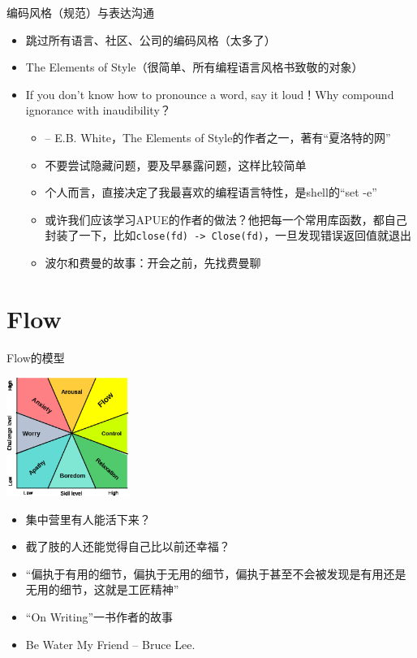 \documentclass[presentation,dvipdfmx,CJKbookmarks]{beamer}
\begin{document}
\begin{CJK*}{UTF8}{simsun}
\begin{frame}[label={sec:org88488d1},fragile]{编码风格（规范）与表达沟通}
 \begin{itemize}[<+->]
\item 跳过所有语言、社区、公司的编码风格（太多了）
\item The Elements of Style（很简单、所有编程语言风格书致敬的对象）
\item If you don't know how to pronounce a word, say it loud！Why compound ignorance with inaudibility？
\begin{itemize}
\item -- E.B. White，The Elements of Style\thinspace 的作者之一，著有“夏洛特的网”
\item 不要尝试隐藏问题，要及早暴露问题，这样比较简单
\item 个人而言，直接决定了我最喜欢的编程语言特性，是\thinspace shell\thinspace 的“set -e”
\item 或许我们应该学习\thinspace APUE\thinspace 的作者的做法？他把每一个常用库函数，都自己封装了一下，比如\thinspace \texttt{close(fd) -> Close(fd)}，一旦发现错误返回值就退出
\end{itemize}

\begin{itemize}
\item 波尔和费曼的故事：开会之前，先找费曼聊
\end{itemize}
\end{itemize}
\end{frame}

\section{Flow}
\label{sec:org41f28eb}

\begin{frame}[label={sec:orge595e17}]{}
\begin{block}{Flow\thinspace 的模型}
\begin{center}
\includegraphics[width=4cm]{./images/flow.ps}
\end{center}
\pause
\begin{itemize}[<+->]
\item 集中营里有人能活下来？
\item 截了肢的人还能觉得自己比以前还幸福？
\item “偏执于有用的细节，偏执于无用的细节，偏执于甚至不会被发现是有用还是无用的细节，这就是工匠精神”
\item “On Writing”一书作者的故事
\item Be Water My Friend -- Bruce Lee.
\end{itemize}
\end{block}
\end{frame}


\end{CJK*}
\end{document}
